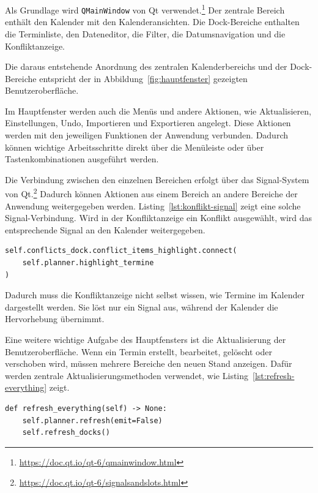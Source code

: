 \documentclass[12pt,a4paper]{article}
\begin{document}
Als Grundlage wird \texttt{QMainWindow} von Qt verwendet.\footnote{\url{https://doc.qt.io/qt-6/qmainwindow.html}} Der zentrale Bereich enthält den Kalender mit den Kalenderansichten. Die Dock-Bereiche enthalten die Terminliste, den Dateneditor, die Filter, die Datumsnavigation und die Konfliktanzeige.

Die daraus entstehende Anordnung des zentralen Kalenderbereichs und der Dock-Bereiche entspricht der in Abbildung~\ref{fig:hauptfenster} gezeigten Benutzeroberfläche.

Im Hauptfenster werden auch die Menüs und andere Aktionen, wie Aktualisieren, Einstellungen, Undo, Importieren und Exportieren angelegt. Diese Aktionen werden mit den jeweiligen Funktionen der Anwendung verbunden. Dadurch können wichtige Arbeitsschritte direkt über die Menüleiste oder über Tastenkombinationen ausgeführt werden.

Die Verbindung zwischen den einzelnen Bereichen erfolgt über das Signal-System von Qt.\footnote{\url{https://doc.qt.io/qt-6/signalsandslots.html}} Dadurch können Aktionen aus einem Bereich an andere Bereiche der Anwendung weitergegeben werden.
Listing~\ref{lst:konflikt-signal} zeigt eine solche Signal-Verbindung. Wird in der Konfliktanzeige ein Konflikt ausgewählt, wird das entsprechende Signal an den Kalender weitergegeben.

\begin{lstlisting}[caption={Signal-Verbindung zwischen Konfliktanzeige und Kalender}, label={lst:konflikt-signal}]
self.conflicts_dock.conflict_items_highlight.connect(
    self.planner.highlight_termine
)
\end{lstlisting}

Dadurch muss die Konfliktanzeige nicht selbst wissen, wie Termine im Kalender dargestellt werden. Sie löst nur ein Signal aus, während der Kalender die Hervorhebung übernimmt.

Eine weitere wichtige Aufgabe des Hauptfensters ist die Aktualisierung der Benutzeroberfläche. Wenn ein Termin erstellt, bearbeitet, gelöscht oder verschoben wird, müssen mehrere Bereiche den neuen Stand anzeigen. Dafür werden zentrale Aktualisierungsmethoden verwendet, wie Listing~\ref{lst:refresh-everything} zeigt.

\begin{lstlisting}[caption={Zentrale Aktualisierung der Benutzeroberfläche}, label={lst:refresh-everything}]
def refresh_everything(self) -> None:
    self.planner.refresh(emit=False)
    self.refresh_docks()
\end{lstlisting}
\end{document}
